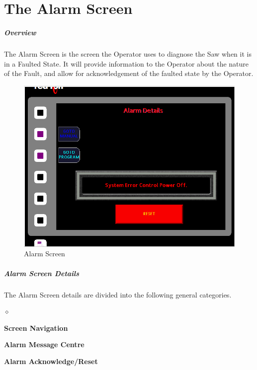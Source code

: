 \chapter{The Alarm Screen}
\paragraph{Overview}
The Alarm Screen is the screen the Operator uses to diagnose the Saw when it is in a Faulted State. It will provide information to the Operator about the nature of the Fault, and allow for acknowledgement of the faulted state by the Operator.
\begin{figure}
	\centering
	\includegraphics[width=0.5
	\linewidth]{screen-captures/alarms}
	\caption{Alarm Screen}
	\label{fig:alarm-screen}
\end{figure}
\pagebreak
\paragraph{Alarm Screen Details}
The Alarm Screen details are divided into the following general categories.
\begin{list}{$\diamond$}{}
	\item \textbf{Screen Navigation}
	\item \textbf{Alarm Message Centre}
	\item \textbf{Alarm Acknowledge/Reset}
\end{list}

